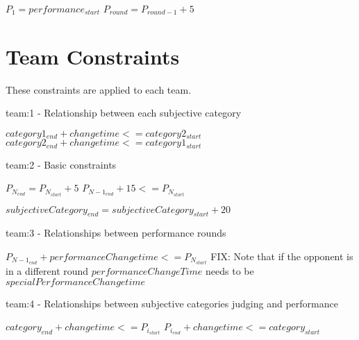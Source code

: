 \documentclass[letterpaper,11pt]{report}
\begin{document}
\begin{algorithmic}
\STATE $P_{1} = performance_{start}$
  \STATE $P_{round} = P_{round-1} + 5$
\ENDFOR
\end{algorithmic}

\FloatBarrier
\section{Team Constraints}
These constraints are applied to each team.

\begin{algorithm}
\caption{team:1 - Relationship between each subjective category}
\begin{algorithmic}
        \STATE $category1_{end} + changetime <= category2_{start}$
      \ELSE
        \STATE $category2_{end} + changetime <= category1_{start}$
      \ENDIF
    \ENDIF
  \ENDFOR
\ENDFOR
\end{algorithmic}
\end{algorithm}

\begin{algorithm}
\caption{team:2 - Basic constraints}
\begin{algorithmic}
  \STATE $P_{N_{end}} = P_{N_{start}} + 5$
\ENDFOR
{}
  \STATE $P_{{N-1}_{end}} + 15 <= P_{N_{start}}$
\ENDFOR

\STATE $subjectiveCategory_{end} = subjectiveCategory_{start} + 20$
\end{algorithmic}
\end{algorithm}

\begin{algorithm}
\caption{team:3 - Relationships between performance rounds}
\begin{algorithmic}
  \STATE $P_{{N-1}_{end}} + performanceChangetime <= P_{N_{start}}$ \COMMENT FIX: Note that if the opponent is in a different round $performanceChangeTime$ needs to be $specialPerformanceChangetime$
\ENDFOR
\end{algorithmic}
\end{algorithm}

\begin{algorithm}
\caption{team:4 - Relationships between subjective categories judging and performance}
\begin{algorithmic}
      \STATE $category_{end} + changetime <= P_{i_{start}}$
    \ELSE
      \STATE $P_{i_{end}} + changetime <= category_{start}$
    \ENDIF
  \ENDFOR
\ENDFOR
\end{algorithmic}
\end{algorithm}
\end{document}
